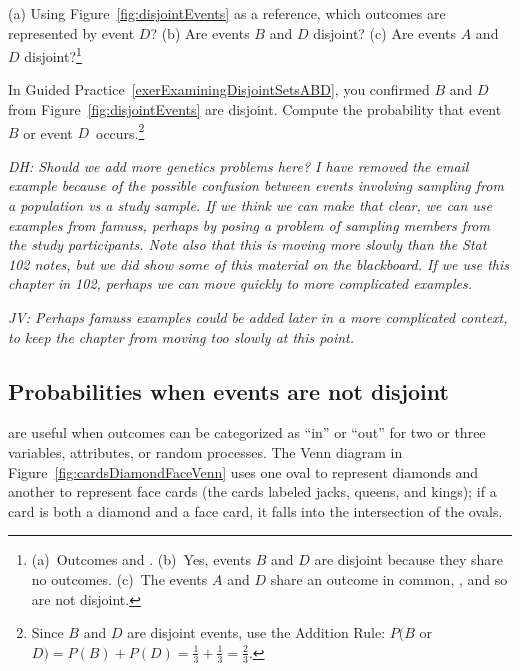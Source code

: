 \begin{exercise} \label{exerExaminingDisjointSetsABD}
(a) Using Figure~\ref{fig:disjointEvents} as a reference, which outcomes are represented by event $D$? (b) Are events $B$ and $D$ disjoint? (c) Are events $A$ and $D$ disjoint?\footnote{(a)~Outcomes  and . (b)~Yes, events $B$ and $D$ are disjoint because they share no outcomes. (c)~The events $A$ and $D$ share an outcome in common, , and so are not disjoint.}
\end{exercise}

\begin{exercise}
In Guided Practice~\ref{exerExaminingDisjointSetsABD}, you confirmed $B$ and $D$ from Figure~\ref{fig:disjointEvents} are disjoint. Compute the probability that event $B$ or event $D$~occurs.\footnote{Since $B$ and $D$ are disjoint events, use the Addition Rule: $P(B$ or $D) = P(B) + P(D) = \frac{1}{3} + \frac{1}{3} = \frac{2}{3}$.}
\end{exercise}

\textit{DH: Should we add more genetics problems here?  I have removed the email example because of the possible confusion between events involving sampling from a population vs a study sample.  If we think we can make that clear, we can use examples from famuss, perhaps by posing a problem of sampling members from the study participants.  Note also that this is moving more slowly than the Stat 102 notes, but we did show some of this material on the blackboard. If we use this chapter in 102, perhaps we can move quickly to more complicated examples.}

\textit{JV: Perhaps famuss examples could be added later in a more complicated context, to keep the chapter from moving too slowly at this point.}


\subsection{Probabilities when events are not disjoint}

 are useful when outcomes can be categorized as ``in'' or ``out'' for two or three variables, attributes, or random processes. The Venn diagram in Figure~\ref{fig:cardsDiamondFaceVenn} uses one oval to represent diamonds and another to represent face cards (the cards labeled jacks, queens, and kings); if a card is both a diamond and a face card, it falls into the intersection of the ovals.


